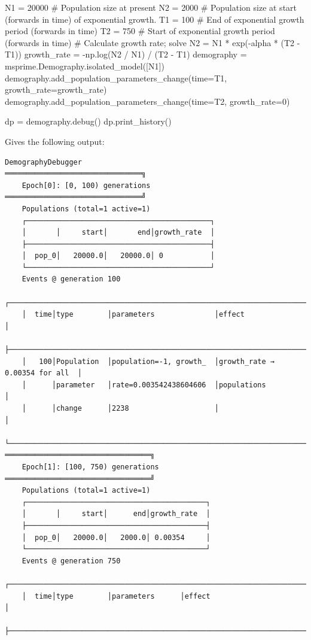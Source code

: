 \documentclass[graybox]{svmult}
\begin{document}
\begin{pythoncode}
N1 = 20000  # Population size at present
N2 = 2000   # Population size at start (forwards in time) of exponential growth.
T1 = 100    # End of exponential growth period (forwards in time)
T2 = 750    # Start of exponential growth period (forwards in time)
# Calculate growth rate; solve N2 = N1 * exp(-alpha * (T2 - T1))
growth_rate = -np.log(N2 / N1) / (T2 - T1)
demography = msprime.Demography.isolated_model([N1])
demography.add_population_parameters_change(time=T1, growth_rate=growth_rate)
demography.add_population_parameters_change(time=T2, growth_rate=0)

dp = demography.debug()
dp.print_history()
\end{pythoncode}

Gives the following output:
\begin{footnotesize}
\begin{verbatim}
DemographyDebugger
════════════════════════════════╗
    Epoch[0]: [0, 100) generations
════════════════════════════════╝
    Populations (total=1 active=1)
    ┌───────────────────────────────────────────┐
    │       │     start│       end│growth_rate  │
    ├───────────────────────────────────────────┤
    │  pop_0│   20000.0│   20000.0│ 0           │
    └───────────────────────────────────────────┘
    Events @ generation 100
    ┌────────────────────────────────────────────────────────────────────────────┐
    │  time│type        │parameters              │effect                         │
    ├────────────────────────────────────────────────────────────────────────────┤
    │   100│Population  │population=-1, growth_  │growth_rate → 0.00354 for all  │
    │      │parameter   │rate=0.003542438604606  │populations                    │
    │      │change      │2238                    │                               │
    └────────────────────────────────────────────────────────────────────────────┘
══════════════════════════════════╗
    Epoch[1]: [100, 750) generations
══════════════════════════════════╝
    Populations (total=1 active=1)
    ┌──────────────────────────────────────────┐
    │       │     start│      end│growth_rate  │
    ├──────────────────────────────────────────┤
    │  pop_0│   20000.0│   2000.0│ 0.00354     │
    └──────────────────────────────────────────┘
    Events @ generation 750
    ┌──────────────────────────────────────────────────────────────────────────┐
    │  time│type        │parameters      │effect                               │
    ├──────────────────────────────────────────────────────────────────────────┤

\end{verbatim}
\end{footnotesize}
\end{document}
